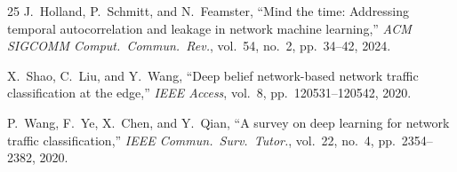 \documentclass[journal]{IEEEtran}
\begin{document}
\begin{thebibliography}{25}
J.~Holland, P.~Schmitt, and N.~Feamster,
``Mind the time: Addressing temporal autocorrelation and leakage in network
machine learning,''
\textit{ACM SIGCOMM Comput.\ Commun.\ Rev.}, vol.~54, no.~2,
pp.~34--42, 2024.

X.~Shao, C.~Liu, and Y.~Wang,
``Deep belief network-based network traffic classification at the edge,''
\textit{IEEE Access}, vol.~8, pp.~120531--120542, 2020.

P.~Wang, F.~Ye, X.~Chen, and Y.~Qian,
``A survey on deep learning for network traffic classification,''
\textit{IEEE Commun.\ Surv.\ Tutor.}, vol.~22, no.~4, pp.~2354--2382, 2020.

\end{thebibliography}
\end{document}

